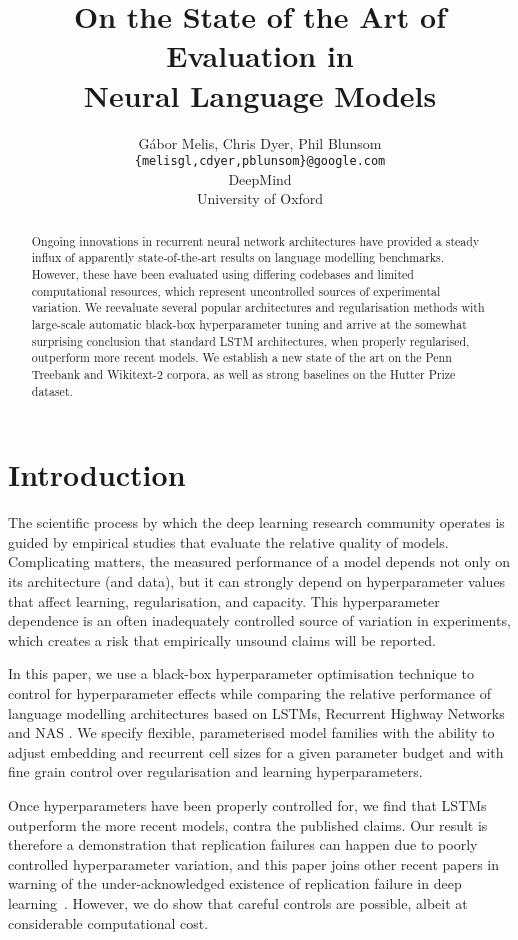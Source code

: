 \documentclass[letter]{article} \usepackage{iclr2018_conference,times}
\title{On the State of the Art of Evaluation in\\ Neural Language Models}
\author{G\'abor Melis, Chris Dyer, Phil Blunsom \\
  {\tt \{melisgl,cdyer,pblunsom\}@google.com}\\
  DeepMind\\
  University of Oxford
}
\begin{document}
\maketitle

\begin{abstract}
  Ongoing innovations in recurrent neural network
  architectures have provided a steady influx of apparently
  state-of-the-art results on language modelling benchmarks. However,
  these have been evaluated using differing codebases and limited
  computational resources, which represent uncontrolled sources of
  experimental variation. We reevaluate several popular
  architectures and regularisation methods with large-scale automatic
  black-box hyperparameter tuning and arrive at the somewhat
  surprising conclusion that standard LSTM architectures, when
  properly regularised, outperform more recent models. We establish a
  new state of the art on the Penn Treebank and Wikitext-2 corpora, as
  well as strong baselines on the Hutter Prize dataset.
\end{abstract}

\section{Introduction}

The scientific process by which the deep learning research community
operates is guided by empirical studies that evaluate the relative
quality of models. Complicating matters, the measured performance of a
model depends not only on its architecture (and data), but it can
strongly depend on hyperparameter values that affect learning,
regularisation, and capacity. This hyperparameter dependence is an
often inadequately controlled source of variation in experiments,
which creates a risk that empirically unsound claims will be reported.

In this paper, we use a black-box hyperparameter optimisation
technique to control for hyperparameter effects while comparing the
relative performance of language modelling architectures based on
LSTMs, Recurrent Highway Networks
\citep{DBLP:journals/corr/ZillySKS16} and NAS \citep{zoph2016neural}.
We specify flexible, parameterised model families with the ability to
adjust embedding and recurrent cell sizes for a given parameter budget
and with fine grain control over regularisation and learning
hyperparameters.

Once hyperparameters have been properly controlled for, we find that
LSTMs outperform the more recent models, contra the published claims.
Our result is therefore a demonstration that replication failures can
happen due to poorly controlled hyperparameter variation, and this
paper joins other recent papers in warning of the under-acknowledged
existence of replication failure in deep
learning~\citep{henderson2017deep,DBLP:journals/corr/ReimersG17a}.
However, we do show that careful controls are possible, albeit at
considerable computational cost.
\end{document}
